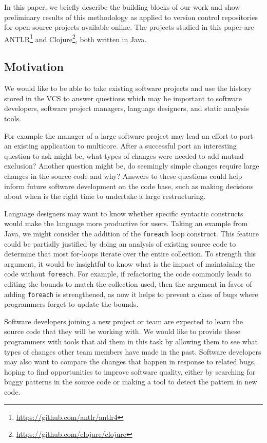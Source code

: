 In this paper, we briefly describe the building blocks of our work and show
preliminary results of this methodology as applied to version control
repositories for open source projects available online.  The projects studied
in this paper are ANTLR\footnote{\url{https://github.com/antlr/antlr4}} and
Clojure\footnote{\url{https://github.com/clojure/clojure}}, both written in
Java.

\subsection{Motivation}
\label{sec:motivation}

We would like to be able to take existing software projects and use the history
stored in the VCS to answer questions which may be important to software
developers, software project managers, language designers, and static analysis
tools.

For example the manager of a large software project may lead an effort to port
an existing application to multicore.  After a successful port an interesting
question to ask might be, what types of changes were needed to add mutual
exclusion? Another question might be, do seemingly simple changes require large
changes in the source code and why?  Answers to these questions could help
inform future software development on the code base, such as making decisions
about when is the right time to undertake a large restructuring.

Language designers may want to know whether specific syntactic constructs would
make the language more productive for users. Taking an example from Java, we
might consider the addition of the {\tt foreach} loop construct. This feature
could be partially justified by doing an analysis of existing source code to
determine that most for-loops iterate over the entire collection. To strength
this argument, it would be insightful to know what is the impact of maintaining
the code without {\tt foreach}. For example, if refactoring the code commonly
leads to editing the bounds to match the collection used, then the argument in
favor of adding {\tt foreach} is strengthened, as now it helps to prevent a
class of bugs where programmers forget to update the bounds.

Software developers joining a new project or team are expected to learn the
source code that they will be working with. We would like to provide these
programmers with tools that aid them in this task by allowing them to see what
types of changes other team members have made in the past. Software developers
may also want to compare the changes that happen in response to related bugs,
hoping to find opportunities to improve software quality, either by searching
for buggy patterns in the source code or making a tool to detect the pattern in
new code.

